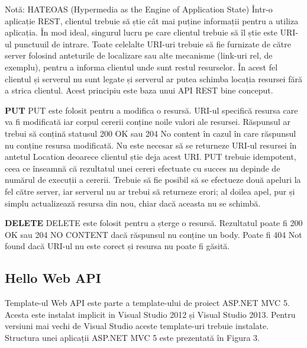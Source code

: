 Notă:
HATEOAS (Hypermedia as the Engine of Application State)
Într-o aplicație REST, clientul trebuie să știe cât mai puține informații pentru a utiliza aplicația. În mod ideal, singurul lucru pe care clientul trebuie să îl știe este URI-ul punctuuil de intrare. Toate celelalte URI-uri trebuie să fie furnizate de către server folosind anteturile de localizare sau alte mecanisme (link-uri rel, de exemplu), pentru a informa clientul unde sunt restul resurselor. În acest fel clientul și serverul nu sunt legate și serverul ar putea schimba locația resursei fără a strica clientul. Acest principiu este baza  unui API REST bine conceput.




\textbf{PUT}
PUT este folosit pentru a modifica o resursă. URI-ul specifică resursa care va fi modificată iar corpul cererii conține noile valori ale resursei. Răspunsul ar trebui să conțină statusul 200 OK sau 204 No content în cazul în care răspunsul nu conține resursa modificată. Nu este necesar să se returneze URI-ul resursei în antetul Location deoarece clientul știe deja acest URI. PUT trebuie idempotent, ceea ce înseamnă că rezultatul unei cereri efectuate cu succes nu depinde de numărul de execuții a cererii. Trebuie să fie posibil să se efectueze două apeluri la fel către server, iar serverul nu ar trebui să returneze erori; al doilea apel, pur și simplu actualizează resursa din nou, chiar dacă aceasta nu se schimbă.

\textbf{DELETE}
DELETE este folosit pentru a șterge o resursă. Rezultatul poate fi 200 OK sau 204 NO CONTENT dacă răspunsul nu conține un body. Poate fi 404 Not found dacă URI-ul nu este corect și resursa nu poate fi găsită.


\subsection{ Hello Web API	}

Template-ul  Web API este parte a template-ului de proiect ASP.NET MVC 5. Acesta este instalat implicit in Visual Studio 2012 și Visual Studio 2013. Pentru versiuni mai vechi de Visual Studio aceste template-uri trebuie instalate.
Structura unei aplicații ASP.NET MVC 5 este prezentată în Figura 3.

